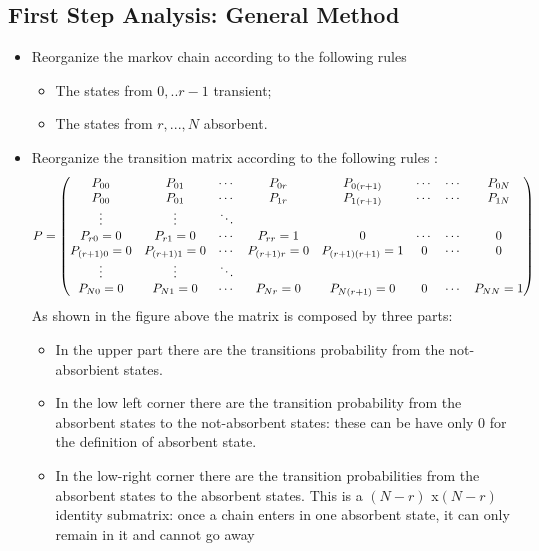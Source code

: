 \subsection{First Step Analysis: General Method}
\begin{itemize}
	\item Reorganize the markov chain according to the following rules
	\begin{itemize}
		\item The states from $0,..r-1$ transient;
		\item The states from $r,...,N$ absorbent.
	\end{itemize}

	\item  Reorganize the transition matrix according to the following rules :
     \begin{equation} P=\begin{pmatrix}
     P_{00} & P_{01} & \cdots & P_{0r}& P_{0(r+1)} &\cdots & \cdots &P_{0N} \\
     P_{00} & P_{01} & \cdots & P_{1r}& P_{1(r+1)}& \cdots & \cdots & P_{1N}\\
     \vdots & \vdots & \ddots  \\
     P_{r0}=0 & P_{r1}=0& \cdots &P_{rr}=1& 0 & \cdots & \cdots &0\\
     P_{(r+1)0}=0 & P_{(r+1)1}=0& \cdots &P_{(r+1)r}=0& P_{(r+1)(r+1)}=1& 0&  \cdots&  0\\
     \vdots & \vdots & \ddots  \\
     P_{N0}=0 & P_{N1}=0& \cdots &P_{Nr}=0& P_{N(r+1)}=0& 0&  \cdots&  P_{NN}=1\\
     
     \end{pmatrix}
$$   
     \end{equation}
     As shown in the figure above the matrix is composed by three parts:
     \begin{itemize}
     	\item In the upper part there are the transitions probability from the not-absorbient states.
     	\item In the low left corner there are the transition probability from  the absorbent states to the not-absorbent states: these can be have only 0 for the definition of absorbent state.
     	\item In the low-right corner there are the transition probabilities from  the absorbent states to the absorbent states. This is a $(N-r)$ x$(N-r)$ identity submatrix: once a chain enters in one absorbent state, it can only remain in it and cannot go away 
     	

\end{itemize}
\end{itemize}
